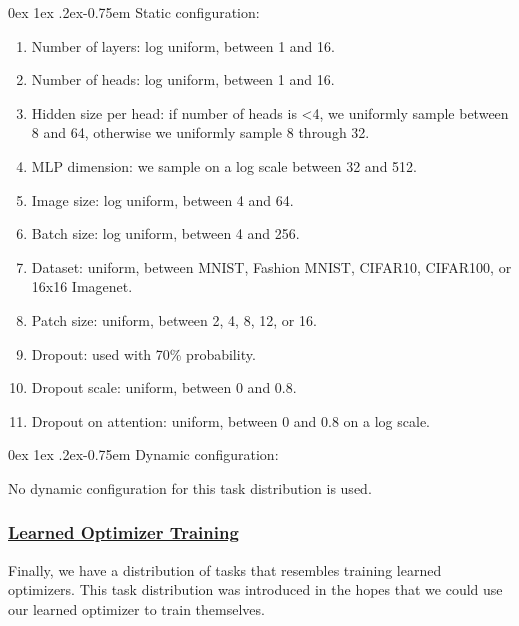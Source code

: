 \documentclass[11pt]{article}
\makeatletter
\renewcommand{\paragraph}{%
  \@startsection{paragraph}{4}%
  {\z@}{0ex \@plus 1ex \@minus .2ex}{-0.75em}%
  {\normalfont\normalsize\bfseries}%
}
\makeatother
\begin{document}
\paragraph{Static configuration:}
\begin{enumerate}
    \item Number of layers: log uniform, between 1 and 16.
    \item Number of heads: log uniform, between 1 and 16.
    \item Hidden size per head: if number of heads is <4, we uniformly sample between 8 and 64, otherwise we uniformly sample 8 through 32.
    \item MLP dimension: we sample on a log scale between 32 and 512.
    \item Image size: log uniform, between 4 and 64.
    \item Batch size: log uniform, between 4 and 256.
    \item Dataset: uniform, between MNIST, Fashion MNIST, CIFAR10, CIFAR100, or 16x16 Imagenet.
    \item Patch size: uniform, between 2, 4, 8, 12, or 16.
    \item Dropout: used with 70\% probability.
    \item Dropout scale: uniform, between 0 and 0.8.
    \item Dropout on attention: uniform, between 0 and 0.8 on a log scale.
\end{enumerate}

\paragraph{Dynamic configuration:}

No dynamic configuration for this task distribution is used.

\subsubsection{\href{https://github.com/google/learned_optimization/blob/4447601601f04e3dc7b1aecd7854d44526593752/learned_optimization/tasks/parametric/lopt.py}{Learned Optimizer Training}}
Finally, we have a distribution of tasks that resembles training learned optimizers.
This task distribution was introduced in the hopes that we could use our learned optimizer to train themselves. 
\end{document}
